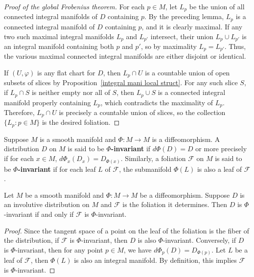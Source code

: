 \begin{proof}[Proof of the global Frobenius theorem]
For each $p\in M$, let $L_p$ be the union of all connected integral manifolds of $D$ containing $p$. By the preceding lemma, $L_p$ is a connected integral manifold of $D$ containing $p$, and it is clearly maximal. If any two such maximal integral manifolds $L_p$ and $L_{p'}$ intersect, their union $L_p\cup L_{p'}$ is an integral manifold containing both $p$ and $p'$, so by maximality $L_p=L_{p'}$. Thus, the various maximal connected integral manifolds are either disjoint or identical.\par
If $(U,\varphi)$ is any flat chart for $D$, then $L_p\cap U$ is a countable union of open subsets of slices by Proposition~\ref{integral mani local struct}. For any such slice $S$, if $L_p\cap S$ is neither empty nor all of $S$, then $L_p\cup S$ is a connected integral manifold properly containing $L_p$, which contradicts the maximality of $L_p$. Therefore, $L_p\cap U$ is precisely a countable union of slices, so the collection $\{L_p:p\in M\}$ is the desired foliation.
\end{proof}
Suppose $M$ is a smooth manifold and $\varPhi:M\to M$ is a diffeomorphism. A distribution 
$D$ on $M$ is said to be \textbf{$\varPhi$-invariant} if $d\varPhi(D)=D$ or more precisely if for 
each $x\in M$, $d\varPhi_x(D_x)=D_{\varPhi(x)}$. Similarly, a foliation $\mathcal{F}$ on 
$M$ is said to be \textbf{$\varPhi$-invariant} if for each leaf $L$ of $\mathcal{F}$, the 
submanifold $\varPhi(L)$ is also a leaf of $\mathcal{F}$.
\begin{proposition}\label{distribution invariant}
Let $M$ be a smooth manifold and $\varPhi:M\to M$ be a diffeomorphism. Suppose $D$ is an 
involutive distribution on $M$ and $\mathcal{F}$ is the foliation it determines. Then $D$ 
is $\varPhi$-invariant if and only if $\mathcal{F}$ is $\varPhi$-invariant.
\end{proposition}
\begin{proof}
Since the tangent space of a point on the leaf of the foliation is the fiber of the distribution, if 
$\mathcal{F}$ is $\varPhi$-invariant, then $D$ is also $\varPhi$-invariant. Conversely, if 
$D$ is $\varPhi$-invariant, then for any point $p\in M$, we have $d\varPhi_p(D)=D_{\varPhi(p)}$. Let $L$ be a leaf of $\mathcal{F}$, then $\varPhi(L)$ is also an integral manifold. By definition, this implies $\mathcal{F}$ is $\varPhi$-invariant.
\end{proof}
